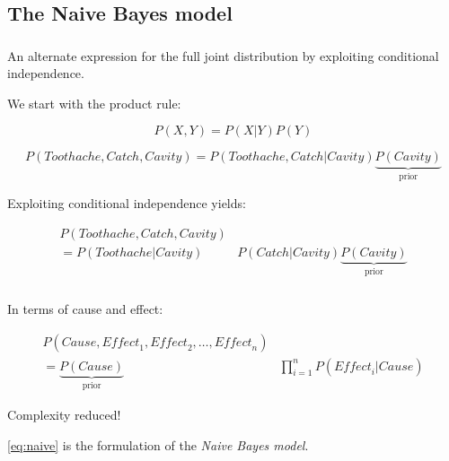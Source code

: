 \subsection{The Naive Bayes model}

\begin{frame}\frametitle{\subsecname}

An alternate expression for the full joint distribution by exploiting conditional independence.

We start with the product rule:

\begin{equation}
P(X,Y) = P(X|Y)P(Y)    
\end{equation}

\begin{equation}
P(\mathit{Toothache},\mathit{Catch},\mathit{Cavity}) = P(\mathit{Toothache},\mathit{Catch}|\mathit{Cavity}) \underbrace{P(\mathit{Cavity})}_{\text{prior}} 
\end{equation}

Exploiting conditional independence yields:

\begin{align}
P(\mathit{Toothache},\mathit{Catch},\mathit{Cavity}) &\\
= P(\mathit{Toothache}|\mathit{Cavity}) &P(\mathit{Catch}|\mathit{Cavity}) \underbrace{P(\mathit{Cavity})}_{\text{prior}} 
\end{align}

\end{frame}

\begin{frame}\frametitle{\subsecname}


In terms of cause and effect:

\begin{align}
P(\mathit{Cause}, \mathit{Effect}_1, \mathit{Effect}_2,\ldots, \mathit{Effect}_n) &\\
= \underbrace{P(\mathit{Cause})}_{\text{prior}} &\prod_{i=1}^{n} P(\mathit{Effect}_{i}|\mathit{Cause})
\label{eq:naive}
\end{align}

Complexity reduced!

\eqref{eq:naive} is the formulation of the \emph{Naive Bayes model}.

\end{frame}
